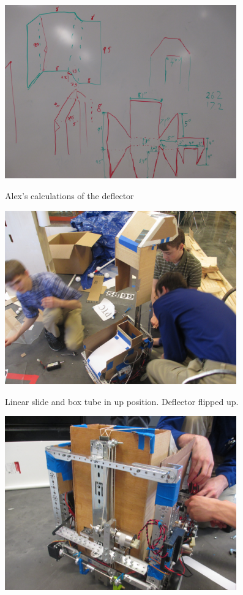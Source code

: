 \begin{center}
\includegraphics[width=10cm]{./Entries/Images/DeflectorDrawing.jpg}
\end{center}

Alex’s calculations of the deflector

\begin{center}
\includegraphics[width=10cm]{./Entries/Images/SlideUP.jpg}
\end{center}

Linear slide and box tube in up position. Deflector flipped up.

\begin{center}
\includegraphics[width=10cm]{./Entries/Images/SlideDown.jpg}
\end{center}

